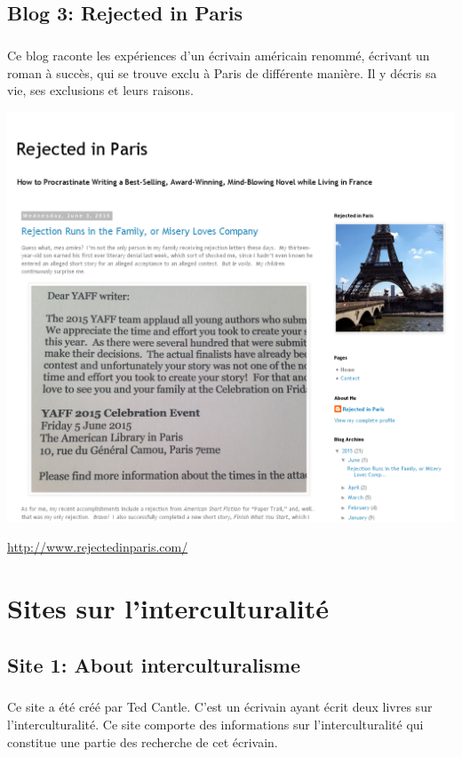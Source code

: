 \section{Blog 3: Rejected in Paris}

\paragraph{} Ce blog raconte les expériences d'un écrivain américain renommé,
écrivant un roman à succès, qui se trouve exclu à Paris de différente manière.
Il y décris sa vie, ses exclusions et leurs raisons.

\begin{center}
	\includegraphics[scale=0.25]{Rejected.png}
\end{center}
\url{http://www.rejectedinparis.com/}

\chapter{Sites sur l'interculturalité}

\section{Site 1: About interculturalisme}

\paragraph{} Ce site a été créé par Ted Cantle. C'est un écrivain ayant écrit
deux livres sur l'interculturalité. Ce site comporte des informations sur
l'interculturalité  qui constitue une partie des recherche de cet écrivain.

